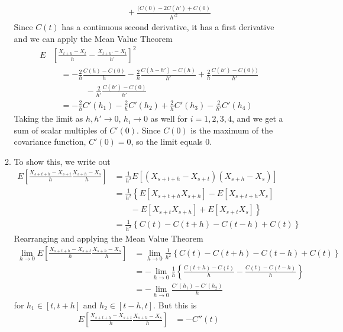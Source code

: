 \documentclass[12pt]{article}
\theoremstyle{plain}
\theoremstyle{definition}
\theoremstyle{remark}
\begin{document}
\begin{enumerate}
\begin{enumerate}
\begin{align*}
        &\qquad\qquad
          + \frac{(C(0) -2C(h') + C(0) }{h'^2}
    \end{align*}
    Since $C(t)$ has a continuous second derivative, it has a first
    derivative and we can apply the Mean Value Theorem
    \begin{align*}
      E&\left[\frac{X_{t+h}-X_t}{h} - \frac{X_{t+h'}-X_t}{h'}\right]^2 \\
        & \quad =
          -\frac{2}{h}\frac{C(h) - C(0)}{h}
          -\frac{2}{h} \frac{C(h-h') - C(h)}{h'}
          +\frac{2}{h} \frac{C(h') -C(0))}{h'}\\
        &\qquad\qquad
          -\frac{2}{h'}\frac{C(h') - C(0)}{h'}\\
        & \quad =
          -\frac{2}{h}C'(h_1)
          -\frac{2}{h} C'(h_2)
          +\frac{2}{h} C'(h_3)
          -\frac{2}{h'}C'(h_4)
    \end{align*}
    Taking the limit as $h,h'\rightarrow 0$, $h_i\rightarrow 0$ as well
    for $i=1,2,3,4$, and we get a sum of scalar multiples of $C'(0)$.
    Since $C(0)$ is the maximum of the covariance function, $C'(0)=0$,
    so the limit equals 0.

    \item %
      To show this, we write out
      \begin{align*}
        E\left[ \frac{X_{s+t+h}-X_{s+t}}{h} \frac{X_{s+h}-X_s}{h}\right]
        &= \frac{1}{h^2}
        E\left[ (X_{s+t+h}-X_{s+t}) (X_{s+h}-X_s)\right]\\
        &= \frac{1}{h^2}\left\{
        E[ X_{s+t+h} X_{s+h}] -E[X_{s+t+h} X_s ] \right. \\
        &\left. \qquad -E[X_{s+t} X_{s+h}]+ E[X_{s+t}X_{s}]
        \right\}\\
        &= \frac{1}{h^2}\left\{ C(t) -C(t+h) -C(t-h)+ C(t) \right\}
      \end{align*}
      Rearranging and applying the Mean Value Theorem
      \begin{align*}
        \lim_{h\rightarrow 0}
        E\left[ \frac{X_{s+t+h}-X_{s+t}}{h} \frac{X_{s+h}-X_s}{h}\right]
        &= \lim_{h\rightarrow 0}
          \frac{1}{h^2}\left\{ C(t) -C(t+h) -C(t-h)+ C(t) \right\}\\
        &= -\lim_{h\rightarrow 0}
          \frac{1}{h}\left\{ \frac{C(t+h) -C(t)}{h} -\frac{C(t) -C(t-h)}{h} \right\}\\
        &= -\lim_{h\rightarrow 0}
          \frac{C'(h_1) - C'(h_2)}{h}
      \end{align*}
      for $h_1 \in [t,t+h]$ and $h_2\in [t-h,t]$. But this is
      \begin{align*}
        E\left[ \frac{X_{s+t+h}-X_{s+t}}{h} \frac{X_{s+h}-X_s}{h}\right]
        &= -C''(t)
      \end{align*}
  \end{enumerate}


\end{enumerate}
\end{document}
